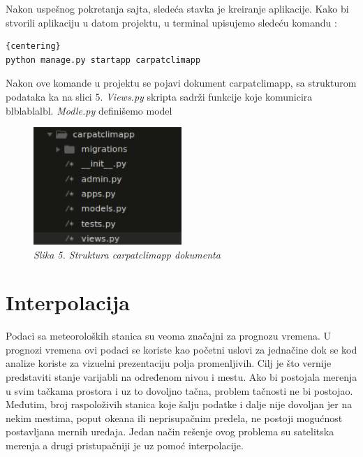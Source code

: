 \documentclass[12pt]{article}
\begin{document}
Nakon uspešnog pokretanja sajta, sledeća stavka je kreiranje aplikacije. Kako bi stvorili aplikaciju u datom projektu, u terminal upisujemo sledeću komandu :
\begin{lstlisting}{centering}
python manage.py startapp carpatclimapp
\end{lstlisting}Nakon ove komande u projektu se pojavi dokument carpatclimapp, sa strukturom podataka ka na slici 5. \textit{Views.py } skripta sadrži funkcije koje komunicira blblablalbl. \textsl{Modle.py} definišemo model
\begin{figure}[h!]
	\centering
	\includegraphics[width=0.5\textwidth]{app.png}
	\caption*{\textsl{Slika 5. Struktura carpatclimapp dokumenta}}
\end{figure}



  

\newpage
\section{Interpolacija}

Podaci sa meteoroloških stanica su veoma značajni za prognozu vremena. U prognozi vremena ovi podaci se koriste kao početni uslovi za jednačine dok se kod analize koriste za vizuelni prezentaciju polja promenljivih. Cilj je što vernije predstaviti stanje varijabli na određenom nivou i mestu. Ako bi postojala merenja u svim tačkama prostora i uz to dovoljno tačna, problem tačnosti ne bi postojao. Međutim, broj raspoloživih stanica koje šalju podatke i dalje nije dovoljan jer na nekim mestima, poput okeana ili neprisupačnim predela, ne postoji mogućnost postavljana mernih uređaja. Jedan način rešenje ovog problema su satelitska merenja a drugi pristupačniji je uz pomoć interpolacije.
\end{document}
